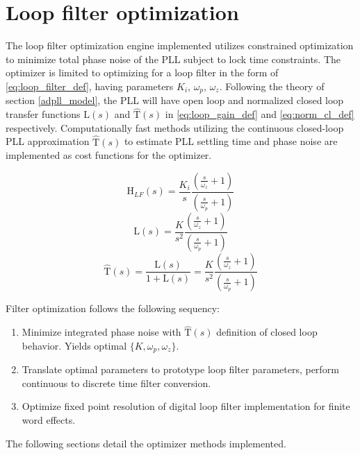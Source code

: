 \section{Loop filter optimization}
The loop filter optimization engine implemented utilizes constrained optimization to minimize total phase noise of the PLL subject to lock time constraints. The optimizer is limited to optimizing for a loop filter in the form of \ref{eq:loop_filter_def}, having parameters $K_i$, $\omega_p$, $\omega_z$. Following the theory of section \ref{adpll_model}, the PLL will have open loop and normalized closed loop transfer functions $\mathrm{L}(s)$ and $\mathrm{\hat{T}}(s)$ in \ref{eq:loop_gain_def} and \ref{eq:norm_cl_def} respectively.  Computationally fast methods utilizing the continuous closed-loop PLL approximation $\mathrm{\hat{T}}(s)$ to estimate PLL settling time and phase noise are implemented as cost functions for the optimizer.

	\begin{equation}\label{eq:loop_filter_def}
	\mathrm{H}_{LF}(s) = \frac{K_i}{s}\frac{(\frac{s}{\omega_z}+1)}{(\frac{s}{\omega_p}+1)}
	\end{equation}
	\begin{equation}\label{eq:loop_gain_def}
	\mathrm{L}(s) = \frac{K}{s^2}\frac{(\frac{s}{\omega_z}+1)}{(\frac{s}{\omega_p}+1)}
	\end{equation}
	\begin{equation}\label{eq:norm_cl_def}
	\mathrm{\hat{T}}(s) = \frac{\mathrm{L}(s)}{1+\mathrm{L}(s)} = \frac{K}{s^2}\frac{(\frac{s}{\omega_z}+1)}{(\frac{s}{\omega_p}+1)}
	\end{equation}

Filter optimization follows the following sequency:
\begin{enumerate}
	\setlength\itemsep{-0.8em}
	\item Minimize integrated phase noise with $\mathrm{\hat{T}}(s)$ definition of closed loop behavior. Yields optimal $\{K, \omega_p, \omega_z\}$.
	\item Translate optimal parameters to prototype loop filter parameters, perform continuous to discrete time filter conversion.
	\item Optimize fixed point resolution of digital loop filter implementation for finite word effects.
\end{enumerate}

The following sections detail the optimizer methods implemented.

